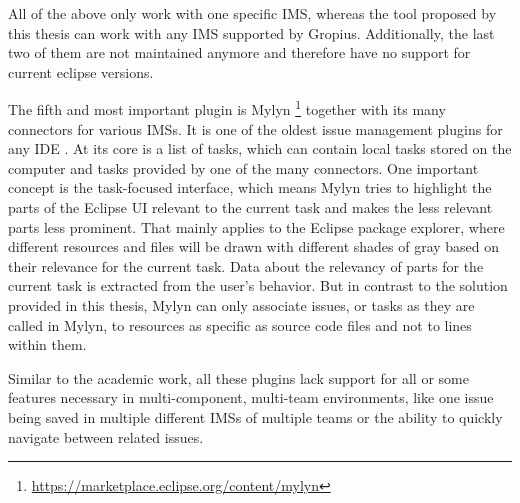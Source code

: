 All of the above only work with one specific \gls{IMS}, whereas the tool proposed by this thesis can work with any \gls{IMS} supported by \gls{Gropius}.
Additionally, the last two of them are not maintained anymore and therefore have no support for current eclipse versions. 

The fifth and most important plugin is Mylyn \footnote{\url{https://marketplace.eclipse.org/content/mylyn}} together with its many connectors for various \glspl{IMS}.
It is one of the oldest issue management plugins for any \gls{IDE} \cite{janak2009issue}.
At its core is a list of tasks, which can contain local tasks stored on the computer and tasks provided by one of the many connectors.
One important concept is the task-focused interface, which means Mylyn tries to highlight the parts of the \gls{Eclipse} \gls{UI} relevant to the current task and makes the less relevant parts less prominent.
That mainly applies to the \gls{Eclipse} package explorer, where different resources and files will be drawn with different shades of gray based on their relevance for the current task.
Data about the relevancy of parts for the current task is extracted from the user's behavior.
But in contrast to the solution provided in this thesis, Mylyn can only associate issues, or tasks as they are called in Mylyn, to resources as specific as source code files and not to lines within them.

Similar to the academic work, all these plugins lack support for all or some features necessary in multi-component, multi-team environments,
like one issue being saved in multiple different \glspl{IMS} of multiple teams or the ability to quickly navigate between related issues.

